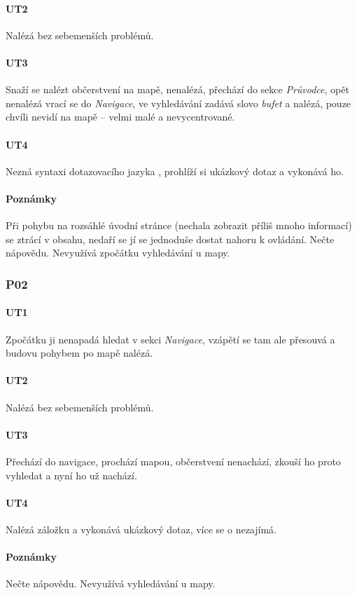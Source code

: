 \paragraph*{UT2}
Nalézá bez sebemenších problémů.
\paragraph*{UT3}
Snaží se nalézt občerstvení na mapě, nenalézá, přechází do sekce \textit{Průvodce}, opět nenalézá vrací se do \textit{Navigace}, ve vyhledávání zadává slovo \textit{bufet} a nalézá, pouze chvíli nevidí na mapě -- velmi malé a nevycentrované.
\paragraph*{UT4}
Nezná syntaxi dotazovacího jazyka , prohlíží si ukázkový dotaz a vykonává ho.
\paragraph*{Poznámky}
Při pohybu na rozsáhlé úvodní stránce (nechala zobrazit příliš mnoho informací) se ztrácí v obsahu, nedaří se jí se jednoduše dostat nahoru k ovládání. Nečte nápovědu. Nevyužívá zpočátku vyhledávání u mapy.

\subsubsection*{P02}
\paragraph*{UT1}
Zpočátku ji nenapadá hledat v sekci \textit{Navigace}, vzápětí se tam ale přesouvá a budovu pohybem po mapě nalézá.
\paragraph*{UT2}
Nalézá bez sebemenších problémů.
\paragraph*{UT3}
Přechází do navigace, prochází mapou, občerstvení nenachází, zkouší ho proto vyhledat a nyní ho už nachází.
\paragraph*{UT4}
Nalézá záložku  a vykonává ukázkový dotaz, více se o  nezajímá.
\paragraph*{Poznámky}
Nečte nápovědu. Nevyužívá vyhledávání u mapy.

